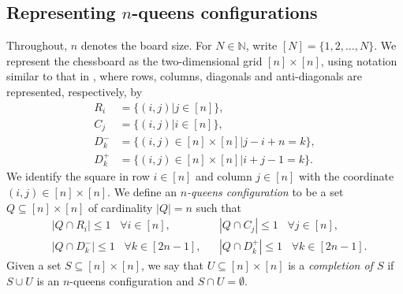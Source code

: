 \documentclass[pdflatex,sn-mathphys-num]{sn-jnl}
\theoremstyle{thmstyleone}
\theoremstyle{thmstyletwo}
\theoremstyle{thmstylethree}
\begin{document}
\subsection{Representing $n$-queens configurations}
Throughout, $n$ denotes the board size. For $N \in \mathbb{N}$, write $[N] = \lbrace 1,2, \dots, N \rbrace$.
We represent the chessboard as the two-dimensional grid $[n] \times [n]$, using notation similar to that in \cite{Glock2022NQueens},
where rows, columns, diagonals and anti-diagonals are represented, respectively, by
\begin{align}
  R_{i} &= \lbrace (i,j) | j \in [n] \rbrace, \\
  C_{j} &= \lbrace (i,j) | i \in [n] \rbrace, \\
  D_{k}^{-} &= \lbrace (i,j) \in [n] \times [n] | j - i + n = k \rbrace, \\
  D_{k}^{+} &= \lbrace (i,j) \in [n] \times [n] | i + j - 1 = k \rbrace.
\end{align}
We identify the square in row $i \in [n]$ and column $j \in [n]$ with the coordinate $(i,j) \in [n] \times [n]$.
We define an \emph{$n$-queens configuration} to be a set $Q \subseteq [n] \times [n]$ of cardinality $|Q| = n$ such that 
\begin{align}
    &|Q \cap R_i| \leq 1 \;\;\; \forall i \in [n], &&|Q \cap C_j| \leq 1 \;\;\; \forall j \in [n], \label{eq:row_col_constraint} \\
    &|Q \cap D_{k}^{-}| \leq 1 \;\;\; \forall k \in [2n-1], &&|Q \cap D_{k}^{+}| \leq 1 \;\;\; \forall k \in [2n-1]. \label{eq:diag_constraint}
\end{align}
Given a set $S \subseteq [n] \times [n]$, we say that $U \subseteq [n] \times [n]$ is a \emph{completion of $S$} if 
$S \cup U$ is an $n$-queens configuration and $S \cap U = \emptyset$.
\end{document}
